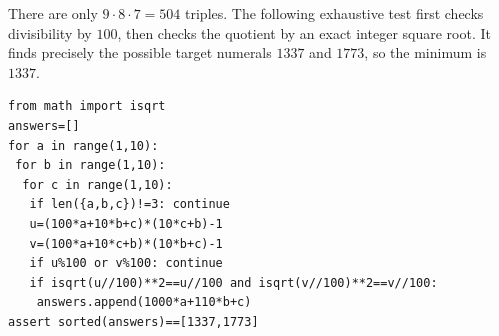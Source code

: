 There are only $9\cdot8\cdot7=504$ triples. The following exhaustive test first checks divisibility by $100$, then checks the quotient by an exact integer square root. It finds precisely the possible target numerals $1337$ and $1773$, so the minimum is $\boxed{1337}$.
\begin{verbatim}
from math import isqrt
answers=[]
for a in range(1,10):
 for b in range(1,10):
  for c in range(1,10):
   if len({a,b,c})!=3: continue
   u=(100*a+10*b+c)*(10*c+b)-1
   v=(100*a+10*c+b)*(10*b+c)-1
   if u%100 or v%100: continue
   if isqrt(u//100)**2==u//100 and isqrt(v//100)**2==v//100:
    answers.append(1000*a+110*b+c)
assert sorted(answers)==[1337,1773]
\end{verbatim}
